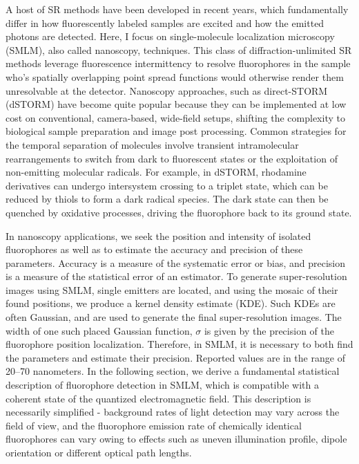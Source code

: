 A host of SR methods have been developed in recent years, which fundamentally differ in how fluorescently labeled samples are excited and how the emitted photons are detected. Here, I focus on single-molecule localization microscopy (SMLM), also called nanoscopy, techniques. This class of diffraction-unlimited SR methods leverage fluorescence intermittency to resolve fluorophores in the sample who’s spatially overlapping point spread functions would otherwise render them unresolvable at the detector. Nanoscopy approaches, such as direct-STORM (dSTORM) have become quite popular because they can be implemented at low cost on conventional, camera-based, wide-field setups, shifting the complexity to biological sample preparation and image post processing. Common strategies for the temporal separation of molecules involve transient intramolecular rearrangements to switch from dark to fluorescent states or the exploitation of non-emitting molecular radicals. For example, in dSTORM, rhodamine derivatives can undergo intersystem crossing to a triplet state, which can be reduced by thiols to form a dark radical species. The dark state can then be quenched by oxidative processes, driving the fluorophore back to its ground state. 

In nanoscopy applications, we seek the position and intensity of isolated fluorophores as well as to estimate the accuracy and precision of these parameters. Accuracy is a measure of the systematic error or bias, and precision is a measure of the statistical error of an estimator. To generate super-resolution images using SMLM, single emitters are located, and using the mosaic of their found positions, we produce a kernel density estimate (KDE). Such KDEs are often Gaussian, and are used to generate the final super-resolution images. The width of one such placed Gaussian function, $\sigma$ is given by the precision of the fluorophore position localization. Therefore, in SMLM, it is necessary to both find the parameters and estimate their precision. Reported values are in the range of 20–70 nanometers. In the following section, we derive a fundamental statistical description of fluorophore detection in SMLM, which is compatible with a coherent state of the quantized electromagnetic field. This description is necessarily simplified - background rates of light detection may vary across the field of view, and the fluorophore emission rate of chemically identical fluorophores can vary owing to effects such as uneven illumination profile, dipole orientation or different optical path lengths.

